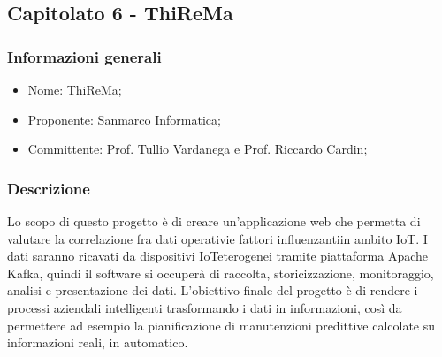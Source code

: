 \subsection{Capitolato 6 - ThiReMa}
\subsubsection{Informazioni generali}
\begin{itemize}
	\item Nome: ThiReMa;
	\item Proponente: Sanmarco Informatica;
	\item Committente: Prof. Tullio Vardanega e Prof. Riccardo Cardin;
\end{itemize}
\subsubsection{Descrizione}
Lo scopo di questo progetto è di creare un'applicazione web che permetta di valutare la correlazione fra dati operativi\glosp e fattori influenzanti\glo in ambito IoT\glo. I dati saranno ricavati da dispositivi IoT\glosp eterogenei tramite piattaforma Apache Kafka\glo, quindi il software si occuperà di raccolta, storicizzazione, monitoraggio, analisi e presentazione dei dati.
L'obiettivo finale del progetto è di rendere i processi aziendali intelligenti trasformando i dati in informazioni, così da permettere ad esempio la pianificazione di manutenzioni predittive calcolate su informazioni reali, in automatico.

